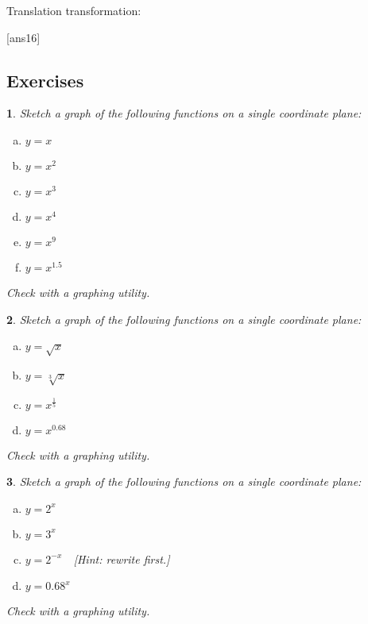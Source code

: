 \documentclass{amsbook}
\newcommand{\ssp}{\begin{enumerate}[(a), leftmargin=*]}
\newcommand{\esp}{\end{enumerate}}
\newtheorem{exc}{}
\newenvironment{ex}{\begin{exc}\normalfont}{\end{exc}}
\numberwithin{section}{chapter}
\numberwithin{equation}{chapter}
\begin{document}
\bigskip
Translation transformation: 



[ans16]
\subsection*{Exercises \nopunct} \hfill


\begin{ex}
	Sketch a graph of the following functions on a single coordinate plane:
	\begin{multicols}{2}
		\ssp
		\item 		$y=x$
		\item 		$y=x^2$
		\item 	$y=x^3$
		\item 	$y=x^4$
		\item	$y=x^9$
		\item 	$y=x^{1.5}$
		\esp
	\end{multicols}
	\begin{sol}
		Check with a graphing utility.
	\end{sol}
\end{ex}

\begin{ex}
Sketch a graph of the following functions on a single coordinate plane:
\begin{multicols}{2}
\ssp
\item 	$y=\sqrt{x}$
\item 	$y=\sqrt[3]{x}$
\item 	$y=x^\frac{1}{5}$
\item 	$y=x^{0.68}$
\esp
\end{multicols}
\begin{sol}
			Check with a graphing utility.
\end{sol}
\end{ex}

\begin{ex}
	Sketch a graph of the following functions on a single coordinate plane:
	\begin{multicols}{2}
		\ssp
		\item 		$y=2^x$
		\item 		$y=3^x$
		\item		$y=2^{-x}$\ \ 	[Hint: rewrite first.]
		\item 		$y={0.68}^x$
		\esp
	\end{multicols}
	\begin{sol}
			Check with a graphing utility.
	\end{sol}
\end{ex}
\end{document}

